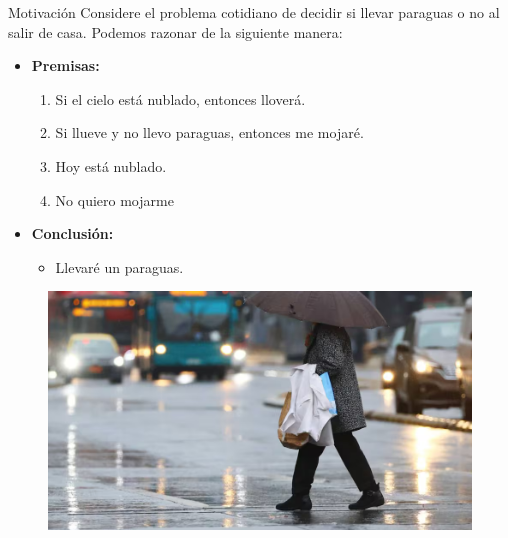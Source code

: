 \documentclass{beamer}
\begin{document}
\begin{frame}{Motivación}
  Considere el problema cotidiano de decidir si llevar paraguas o no al salir de
  casa. Podemos razonar de la siguiente manera:

  \begin{itemize}[<+->]
    \item \textbf{Premisas:}
          \begin{enumerate}[<+->]
            \item Si el cielo está nublado, entonces lloverá.
            \item Si llueve y no llevo paraguas, entonces me mojaré.
            \item Hoy está nublado.
            \item No quiero mojarme
          \end{enumerate}

          \item \textbf{Conclusión:}
          \begin{itemize}
            \item Llevaré un paraguas.
          \end{itemize}
  \end{itemize}

  \begin{figure}
    \centering
    \includegraphics[width=.55\linewidth]{images/paraguas.png}
  \end{figure}

\end{frame}
\end{document}
